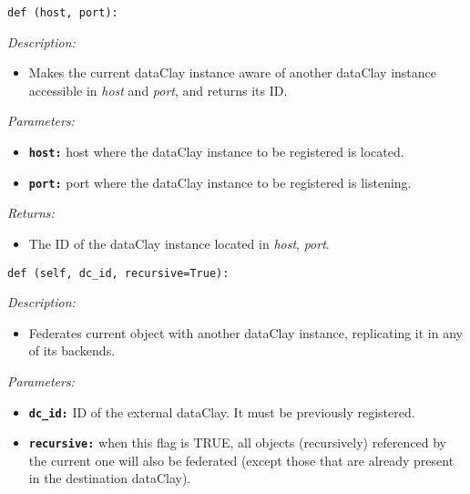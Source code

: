\begin{dBox}
\texttt{def (host, port):}
\LINE

{\it Description:}

\begin{itemize}
    \item Makes the current dataClay instance aware of another dataClay instance accessible in \textit{host} and \textit{port}, and returns its ID.
\end{itemize}

{\it Parameters:}

\begin{itemize}
  \item \texttt{\bfseries host:} host where the dataClay instance to be registered is located.
  \item \texttt{\bfseries port:} port where the dataClay instance to be registered is listening.
\end{itemize}

{\it Returns:}

\begin{itemize}
 \item The ID of the dataClay instance located in \textit{host}, \textit{port}.
\end{itemize}

\end{dBox}

\begin{dBox}
\texttt{def (self, dc\_id, recursive=True):}
\LINE

{\it Description:}

\begin{itemize}
  \item Federates current object with another dataClay instance, replicating it in any of its backends. 
\end{itemize}

{\it Parameters:}

\begin{itemize}
  \item \texttt{\bfseries dc\_id:} ID of the external dataClay. It must be previously registered.
  \item \texttt{\bfseries recursive:} when this flag is TRUE, all objects (recursively) referenced by the current one will also be federated (except those that are already present in the destination dataClay). 
\end{itemize}
\end{dBox}


